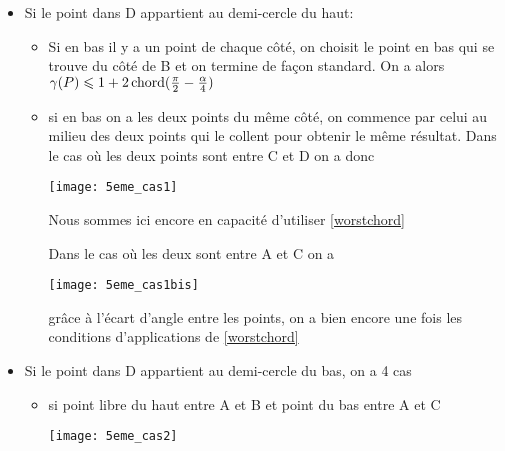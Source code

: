\begin{itemize}

\item \label{5cas1} Si le point dans D appartient au demi-cercle du haut:

\begin{itemize}

\item \label{5cas11} Si en bas il y a un point de chaque côté, on choisit le point en bas qui se trouve du côté de B et on termine de façon standard. On a alors $\gamma(P) \leqslant 1 + 2\operatorname{chord}(\frac{\pi}{2} - \frac{\alpha}{4})$

\item \label{5cas12} si en bas on a les deux points du même côté, on commence par celui au milieu des deux points qui le collent pour obtenir le même résultat.
Dans le cas où les deux points sont entre C et D on a donc

  \texttt{[image: 5eme\_cas1]}

Nous sommes ici encore en capacité d'utiliser \ref{worstchord}

\label{5cas13} Dans le cas où les deux sont entre A et C on a

  \texttt{[image: 5eme\_cas1bis]}

grâce à l'écart d'angle entre les points, on a bien encore une fois les conditions d'applications de \ref{worstchord}

\end{itemize}

\item \label{5cas2} Si le point dans D appartient au demi-cercle du bas, on a 4 cas

\begin{itemize}

\item \label{5cas21} si point libre du haut entre A et B et point du bas entre A et C

  \texttt{[image: 5eme\_cas2]}


\end{itemize}
\end{itemize}
